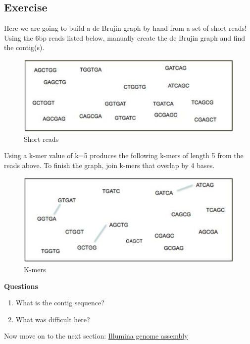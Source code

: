 \documentclass[11pt]{article}
\begin{document}
    \hypertarget{exercise}{%
\subsection{Exercise}\label{exercise}}

Here we are going to build a de Brujin graph by hand from a set of short
reads! Using the 6bp reads listed below, manually create the de Brujin
graph and find the contig(s).

    \begin{figure}
\centering
\includegraphics{images/debruijn1.png}
\caption{Short reads}
\end{figure}

    Using a k-mer value of k=5 produces the following k-mers of length 5
from the reads above. To finish the graph, join k-mers that overlap by 4
bases.

    \begin{figure}
\centering
\includegraphics{images/debruijn2.png}
\caption{K-mers}
\end{figure}

    \textbf{Questions}

\begin{enumerate}
\def\labelenumi{\arabic{enumi}.}
\item
  What is the contig sequence?
\item
  What was difficult here?
\end{enumerate}

    Now move on to the next section: \href{illumina_assembly.ipynb}{Illumina
genome assembly}
\end{document}
